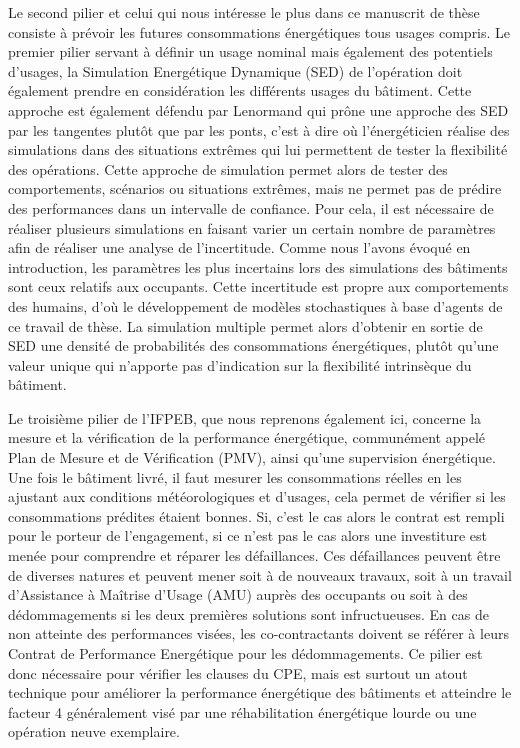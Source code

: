 Le second pilier et celui qui nous intéresse le plus dans ce manuscrit de thèse consiste à prévoir les futures consommations énergétiques tous usages compris. Le premier pilier servant à définir un usage nominal mais également des potentiels d'usages, la Simulation Energétique Dynamique (SED) de l'opération doit également prendre en considération les différents usages du bâtiment. Cette approche est également défendu par Lenormand \cite{Lenormand-15} qui prône une approche des SED par les tangentes plutôt que par les ponts, c'est à dire où l'énergéticien réalise des simulations dans des situations extrêmes qui lui permettent de tester la flexibilité des opérations. Cette approche de simulation permet alors de tester des comportements, scénarios ou situations extrêmes, mais ne permet pas de prédire des performances dans un intervalle de confiance. Pour cela, il est nécessaire de réaliser plusieurs simulations en faisant varier un certain nombre de paramètres afin de réaliser une analyse de l'incertitude. Comme nous l'avons évoqué en introduction, les paramètres les plus incertains lors des simulations des bâtiments sont ceux relatifs aux occupants. Cette incertitude est propre aux comportements des humains, d'où le développement de modèles stochastiques à base d'agents de ce travail de thèse. La simulation multiple permet alors d'obtenir en sortie de SED une densité de probabilités des consommations énergétiques, plutôt qu'une valeur unique qui n'apporte pas d'indication sur la flexibilité intrinsèque du bâtiment.

Le troisième pilier de l'IFPEB, que nous reprenons également ici, concerne la mesure et la vérification de la performance énergétique, communément appelé Plan de Mesure et de Vérification (PMV), ainsi qu'une supervision énergétique. Une fois le bâtiment livré, il faut mesurer les consommations réelles en les ajustant aux conditions météorologiques et d'usages, cela permet de vérifier si les consommations prédites étaient bonnes. Si, c'est le cas alors le contrat est rempli pour le porteur de l'engagement, si ce n'est pas le cas alors une investiture est menée pour comprendre et réparer les défaillances. Ces défaillances peuvent être de diverses natures et peuvent mener soit à de nouveaux travaux, soit à un travail d'Assistance à Maîtrise d'Usage (AMU) auprès des occupants ou soit à des dédommagements si les deux premières solutions sont infructueuses. En cas de non atteinte des performances visées, les co-contractants doivent se référer à leurs Contrat de Performance Energétique pour les dédommagements. Ce pilier est donc nécessaire pour vérifier les clauses du CPE, mais est surtout un atout technique pour améliorer la performance énergétique des bâtiments et atteindre le facteur 4 généralement visé par une réhabilitation énergétique lourde ou une opération neuve exemplaire.

